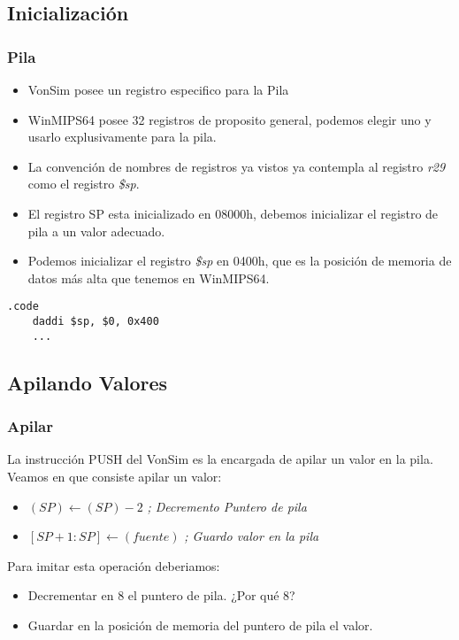 \documentclass{beamer}
\begin{document}
\subsection{Inicialización}
\begin{frame}[fragile]
\frametitle{Pila}
\begin{itemize}
\item VonSim posee un registro especifico para la Pila
\item WinMIPS64 posee 32 registros de proposito general, podemos elegir uno y usarlo explusivamente para la pila. 
\item La convención de nombres de registros ya vistos ya contempla al registro \emph{r29} como el registro \emph{\$sp}.
\item El registro SP esta inicializado en 08000h, debemos inicializar el registro de pila a un valor adecuado.
\item Podemos inicializar el registro \emph{\$sp} en 0400h, que es la posición de memoria de datos más alta que tenemos en WinMIPS64.
\end{itemize}

\begin{block}{}
\begin{lstlisting}[basicstyle=\ttfamily,keywordstyle=\color{blue}]
    .code
    daddi $sp, $0, 0x400
    ...
\end{lstlisting}
\end{block}

\end{frame}

\subsection{Apilando Valores}
\begin{frame}
\frametitle{Apilar}
La instrucción PUSH del VonSim es la encargada de apilar un valor en la pila. Veamos en que consiste apilar un valor:
\begin{itemize}
\item $(SP) \xleftarrow{} (SP) - 2$ \emph{; Decremento Puntero de pila}
\item $[SP+1:SP] \xleftarrow{} (fuente)$ \emph{; Guardo valor en la pila}
\end{itemize}
Para imitar esta operación deberiamos:
\begin{itemize}
\item Decrementar en 8 el puntero de pila. ¿Por qué 8?
\item Guardar en la posición de memoria del puntero de pila el valor.
\end{itemize}

\end{frame}
\end{document}
